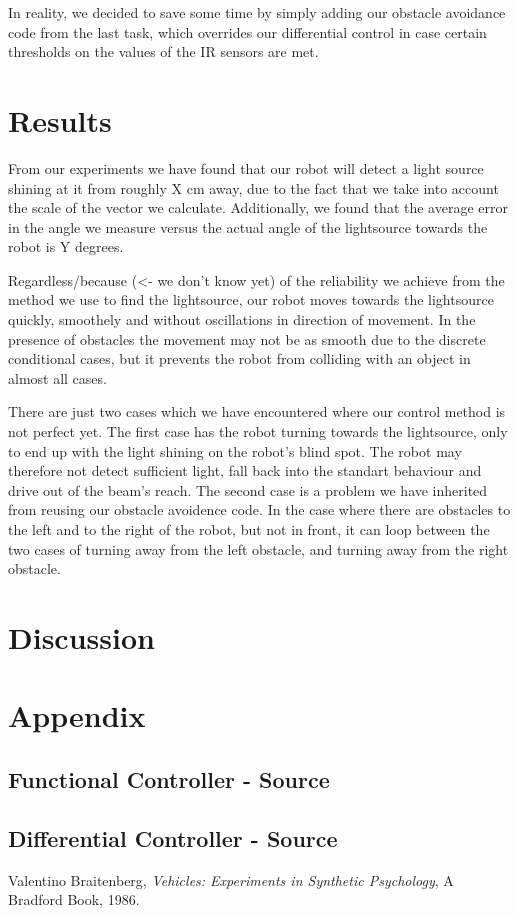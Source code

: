 \documentclass[paper=a4, fontsize=12pt]{scrartcl}	%
\numberwithin{equation}{section}		%
\numberwithin{figure}{section}			%
\numberwithin{table}{section}				%
\begin{document}
In reality, we decided to save some time by simply adding our obstacle avoidance code from the last task, which overrides our differential control in case certain thresholds on the values of the IR sensors are met.
\section{Results}
From our experiments we have found that our robot will detect a light source shining at it from roughly X cm away, due to the fact that we take into account the scale of the vector we calculate. Additionally, we found that the average error in the angle we measure versus the actual angle of the lightsource towards the robot is Y degrees.

Regardless/because (<- we don't know yet) of the reliability we achieve from the method we use to find the lightsource, our robot moves towards the lightsource quickly, smoothely and without oscillations in direction of movement. In the presence of obstacles the movement may not be as smooth due to the discrete conditional cases, but it prevents the robot from colliding with an object in almost all cases.

There are just two cases which we have encountered where our control method is not perfect yet. The first case has the robot turning towards the lightsource, only to end up with the light shining on the robot's blind spot. The robot may therefore not detect sufficient light, fall back into the standart behaviour and drive out of the beam's reach. The second case is a problem we have inherited from reusing our obstacle avoidence code. In the case where there are obstacles to the left and to the right of the robot, but not in front, it can loop between the two cases of turning away from the left obstacle, and turning away from the right obstacle.
\section{Discussion}


\section{Appendix}
\subsection{Functional Controller - Source}

\subsection{Differential Controller - Source}

\begin{thebibliography}{9}
  Valentino Braitenberg,
  \emph{Vehicles: Experiments in Synthetic Psychology},
  A Bradford Book,
  1986.
\end{thebibliography}

\end{document}
